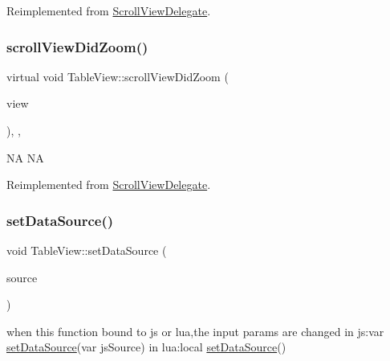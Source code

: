 Reimplemented from \hyperlink{classScrollViewDelegate_a442695e2f1b1d9ee3959a0a5e8d1bd03}{Scroll\+View\+Delegate}.

\mbox{\label{classTableView_a5c83605ee0059fa74e9c184301cbb368}} 
\subsubsection{\texorpdfstring{scroll\+View\+Did\+Zoom()}{scrollViewDidZoom()}\hspace{0.1cm}{\footnotesize\ttfamily [2/2]}}
{\footnotesize\ttfamily virtual void Table\+View\+::scroll\+View\+Did\+Zoom (\begin{DoxyParamCaption}\item[{\hyperlink{classScrollView}{Scroll\+View} $\ast$}]{view }\end{DoxyParamCaption})\hspace{0.3cm}{\ttfamily [inline]}, {\ttfamily [override]}, {\ttfamily [virtual]}}

NA  NA 

Reimplemented from \hyperlink{classScrollViewDelegate_a442695e2f1b1d9ee3959a0a5e8d1bd03}{Scroll\+View\+Delegate}.

\mbox{\label{classTableView_a3871ed3e4b512026027371680dd23159}} 
\subsubsection{\texorpdfstring{set\+Data\+Source()}{setDataSource()}\hspace{0.1cm}{\footnotesize\ttfamily [1/2]}}
{\footnotesize\ttfamily void Table\+View\+::set\+Data\+Source (\begin{DoxyParamCaption}\item[{\hyperlink{classTableViewDataSource}{Table\+View\+Data\+Source} $\ast$}]{source }\end{DoxyParamCaption})\hspace{0.3cm}{\ttfamily [inline]}}


\begin{DoxyCode}
when \textcolor{keyword}{this} \textcolor{keyword}{function} bound to js or lua,the input params are changed
in js:var \hyperlink{classTableView_a3871ed3e4b512026027371680dd23159}{setDataSource}(var jsSource)
in lua:local \hyperlink{classTableView_a3871ed3e4b512026027371680dd23159}{setDataSource}()
\end{DoxyCode}
 \mbox{\label{classTableView_a3871ed3e4b512026027371680dd23159}} 
